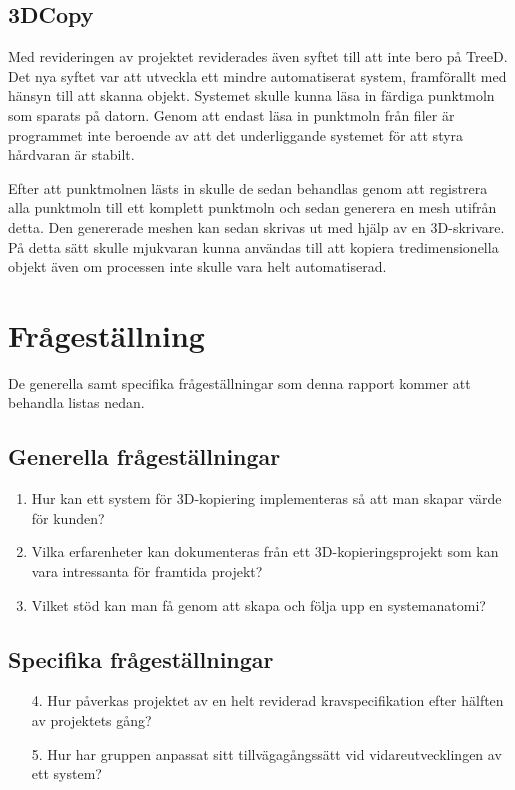 \subsection{3DCopy}
Med revideringen av projektet reviderades även syftet till att inte bero på TreeD. Det nya syftet var att utveckla ett mindre automatiserat system, framförallt med hänsyn till att skanna objekt. Systemet skulle kunna läsa in färdiga punktmoln som sparats på datorn. Genom att endast läsa in punktmoln från filer är programmet inte beroende av att det underliggande systemet för att styra hårdvaran är stabilt.

Efter att punktmolnen lästs in skulle de sedan behandlas genom att registrera alla punktmoln till ett komplett punktmoln och sedan generera en mesh utifrån detta. Den genererade meshen kan sedan skrivas ut med hjälp av en 3D-skrivare. På detta sätt skulle mjukvaran kunna användas till att kopiera tredimensionella objekt även om processen inte skulle vara helt automatiserad.


\section{Frågeställning}
\label{sec:research-questions}
De generella samt specifika frågeställningar som denna rapport kommer att behandla listas nedan.

\subsection{Generella frågeställningar}

\begin{enumerate}
	\item Hur kan ett system för 3D-kopiering implementeras så att man skapar värde för kunden?
	\item Vilka erfarenheter kan dokumenteras från ett 3D-kopieringsprojekt som kan vara intressanta för framtida projekt?
	\item Vilket stöd kan man få genom att skapa och följa upp en systemanatomi?
\end{enumerate}
	
\subsection{Specifika frågeställningar}

\begin{enumerate}
	\item [4.] Hur påverkas projektet av en helt reviderad kravspecifikation efter hälften av projektets gång?
	\item [5.] Hur har gruppen anpassat sitt tillvägagångssätt vid vidareutvecklingen av ett system?
	
\end{enumerate}

